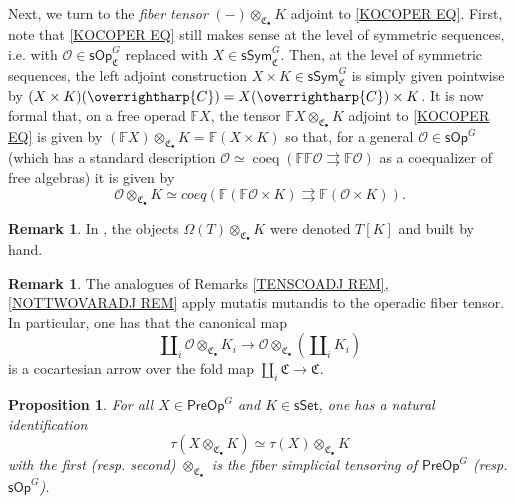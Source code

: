 \documentclass[a4paper,10pt]{article}%
\numberwithin{equation}{section}
\numberwithin{figure}{section}
\newtheorem{proposition}[equation]{Proposition}%
\theoremstyle{definition} %
\newtheorem{remark}[equation]{Remark}%
\newcommand{\vect}[1]{\text{\overrightharp{\ensuremath{#1}}}}
\newcommand{\sSet}{\ensuremath{\mathsf{sSet}}}%
\newcommand{\sOp}{\ensuremath{\mathsf{sOp}}}%
\renewcommand{\O}{\ensuremath{\mathcal O}}
\newcommand{\1}{\ensuremath{\mathbbm 1}}%
\begin{document}
Next, we turn to the \emph{fiber tensor} 
$(-)\otimes_{\mathfrak{C}_{\bullet}} K$
adjoint to \eqref{KOCOPER EQ}.
First, note that 
\eqref{KOCOPER EQ}
still makes sense 
at the level of symmetric sequences, i.e. 
with 
$\O \in \mathsf{sOp}^G_{\mathfrak{C}}$
replaced with
$X \in \mathsf{sSym}^G_{\mathfrak{C}}$.
Then, at the level of symmetric sequences, the left adjoint construction
$X \times K \in \mathsf{sSym}^G_{\mathfrak{C}}$
is simply given pointwise by
$(X \times K)(\vect{C}) = X(\vect{C}) \times K$.
It is now formal that, 
on a free operad $\mathbb{F} X$,
the tensor $\mathbb{F} X \otimes_{\mathfrak{C}_{\bullet}} K$
adjoint to \eqref{KOCOPER EQ} is given by 
$(\mathbb{F} X) \otimes_{\mathfrak{C}_{\bullet}} K
= \mathbb{F} (X \times K)$
so that,
for a general $\O \in \mathsf{sOp}^G$
(which has a standard description
$\O \simeq \mathop{coeq} (\mathbb{F}\mathbb{F}\O \rightrightarrows \mathbb{F}\O)$
as a coequalizer of free algebras)
it is given by
\[
\mathcal{O} \otimes_{\mathfrak{C}_{\bullet}} K
\simeq
coeq 
\left(
\mathbb{F} (\mathbb{F} \O \times K) 
\rightrightarrows \mathbb{F} (\O \times K) 
\right).
\]
\begin{remark}\label{BYHAND2 REM}
	In \cite[\S 7.1]{CM13b}, 
	the objects $\Omega(T)  \otimes_{\mathfrak{C}_{\bullet}} K$
	were denoted $T[K]$ and built by hand.
\end{remark}


\begin{remark}
	The analogues of Remarks \ref{TENSCOADJ REM},
	\ref{NOTTWOVARADJ REM}
	apply mutatis mutandis to the operadic fiber tensor.
%	
	In particular, one has that the canonical map
\begin{equation}\label{COCARTAR EQ}
	\amalg_i \O \otimes_{\mathfrak{C}_{\bullet}} K_i
	\to
	\O \otimes_{\mathfrak{C}_{\bullet}} (\amalg_i K_i)
\end{equation}
	is a cocartesian arrow over the fold map
	$\amalg_i \mathfrak{C} \to \mathfrak{C}$.
\end{remark}



\begin{proposition}\label{TAUOTIMES_PROP}
	For all $X \in \mathsf{PreOp}^G$ and $K \in \sSet$, 
	one has a natural identification
	\[\tau(X \otimes_{\mathfrak{C}_{\bullet}} K) \simeq \tau(X) \otimes_{\mathfrak{C}_{\bullet}} K\]
	with the first (resp. second) $\otimes_{\mathfrak{C}_{\bullet}}$ is 
	the fiber simplicial tensoring of $\mathsf{PreOp}^G$ 
	(resp. $\sOp^G$).
\end{proposition}
\end{document}
